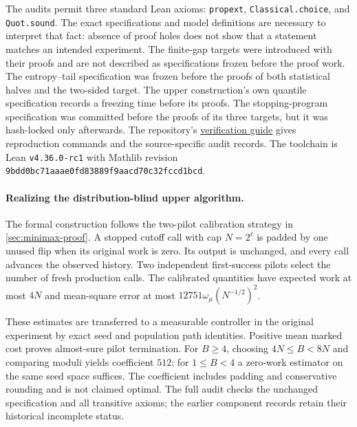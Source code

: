 The audits permit three standard Lean axioms: \texttt{propext},
\texttt{Classical.choice}, and \texttt{Quot.sound}.
The exact specifications and model definitions are necessary to interpret
that fact: absence of proof holes does not show that a statement matches
an intended experiment. The finite-gap targets were introduced with their
proofs and are not described as specifications frozen before the proof work.
The entropy--tail specification was frozen before the proofs of both
statistical halves and the two-sided target. The upper construction's own quantile specification records a
freezing time before its proofs. The stopping-program specification was
committed before the proofs of its three targets, but it was hash-locked
only afterwards.
The repository's \href{https://github.com/davidiach/adaptive-threshold-estimation/blob/eabf274cb42d4bff4daab6b58568ad6169e7f0a7/docs/VERIFY.md}{verification guide}
gives reproduction commands and the source-specific audit records.
The toolchain is Lean \texttt{v4.36.0-rc1} with Mathlib revision
\nolinkurl{9bdd0bc71aaae0fd83889f9aacd70c32fccd1bcd}.

\paragraph{Realizing the distribution-blind upper algorithm.}
The formal construction follows the two-pilot calibration strategy in
\cref{sec:minimax-proof}. A stopped cutoff call with cap $N=2^\ell$ is
padded by one unused flip when its original work is zero. Its output
is unchanged, and every call advances the observed history. Two independent
first-success pilots select the number of fresh production calls. The
calibrated quantities have expected work at most $4N$ and mean-square
error at most $12751\omega_\mu(N^{-1/2})^2$.

These estimates are transferred to a measurable controller in the original
experiment by exact seed and population path identities. Positive mean
marked cost proves almost-sure pilot termination. For $B\ge4$, choosing
$4N\le B<8N$ and comparing moduli yields coefficient $512$; for $1\le B<4$
a zero-work estimator on the same seed space suffices. The coefficient
includes padding and conservative rounding and is not claimed optimal.
The full audit checks the unchanged specification and all transitive axioms;
the earlier component records retain their historical incomplete status.

